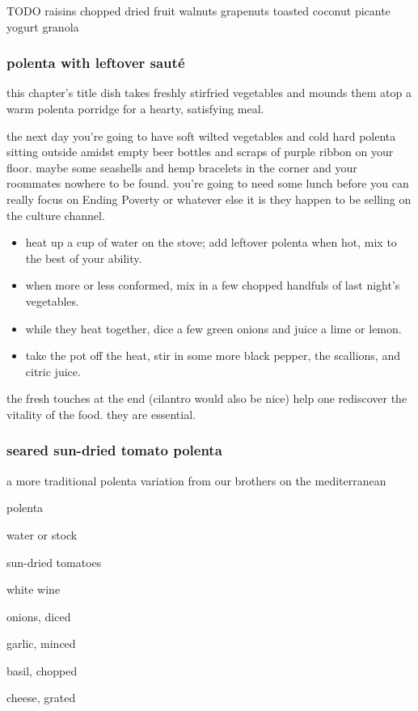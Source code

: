 TODO
	raisins
		chopped dried fruit
						walnuts
	grapenuts
			toasted coconut
					picante
		yogurt
			granola	

\subsubsection{polenta with leftover saut\'{e}}

this chapter's title dish takes freshly stirfried vegetables and mounds 
them atop a warm polenta porridge for a hearty, satisfying meal.

the next day you're going to have soft wilted vegetables and cold hard 
polenta sitting outside amidst empty beer bottles and scraps of purple 
ribbon on your floor. maybe some seashells and hemp bracelets in the corner 
and your roommates nowhere to be found. you're going to need some lunch 
before you can really focus on Ending Poverty or whatever else it is they 
happen to be selling on the culture channel.

\begin{itemize}

  \item heat up a cup of water on the stove; add leftover polenta when hot, 
  mix to the best of your ability.

  \item when more or less conformed, mix in a few chopped handfuls of last 
  night's vegetables.

  \item while they heat together, dice a few green onions and juice a lime or 
  lemon.

  \item take the pot off the heat, stir in some more black pepper, the 
  scallions, and citric juice.

\end{itemize}

the fresh touches at the end (cilantro would also be nice) help one rediscover 
the vitality of the food. they are essential. 	

\subsubsection{seared sun-dried tomato polenta}

a more traditional polenta variation from our brothers on the mediterranean

\begin{ingredients}
  \item polenta
  \item water or stock
  \item sun-dried tomatoes
  \item white wine
  \item onions, diced
  \item garlic, minced
  \item basil, chopped
  \item cheese, grated
\end{ingredients}

